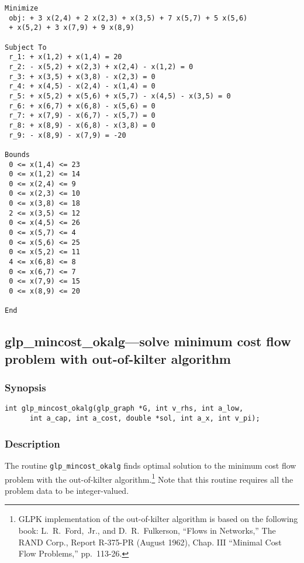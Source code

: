 \begin{footnotesize}
\begin{verbatim}
Minimize
 obj: + 3 x(2,4) + 2 x(2,3) + x(3,5) + 7 x(5,7) + 5 x(5,6)
 + x(5,2) + 3 x(7,9) + 9 x(8,9)

Subject To
 r_1: + x(1,2) + x(1,4) = 20
 r_2: - x(5,2) + x(2,3) + x(2,4) - x(1,2) = 0
 r_3: + x(3,5) + x(3,8) - x(2,3) = 0
 r_4: + x(4,5) - x(2,4) - x(1,4) = 0
 r_5: + x(5,2) + x(5,6) + x(5,7) - x(4,5) - x(3,5) = 0
 r_6: + x(6,7) + x(6,8) - x(5,6) = 0
 r_7: + x(7,9) - x(6,7) - x(5,7) = 0
 r_8: + x(8,9) - x(6,8) - x(3,8) = 0
 r_9: - x(8,9) - x(7,9) = -20

Bounds
 0 <= x(1,4) <= 23
 0 <= x(1,2) <= 14
 0 <= x(2,4) <= 9
 0 <= x(2,3) <= 10
 0 <= x(3,8) <= 18
 2 <= x(3,5) <= 12
 0 <= x(4,5) <= 26
 0 <= x(5,7) <= 4
 0 <= x(5,6) <= 25
 0 <= x(5,2) <= 11
 4 <= x(6,8) <= 8
 0 <= x(6,7) <= 7
 0 <= x(7,9) <= 15
 0 <= x(8,9) <= 20

End
\end{verbatim}
\end{footnotesize}

\subsection{glp\_mincost\_okalg---solve minimum cost flow problem with
out-of-kilter algorithm}

\subsubsection*{Synopsis}

\begin{verbatim}
int glp_mincost_okalg(glp_graph *G, int v_rhs, int a_low,
      int a_cap, int a_cost, double *sol, int a_x, int v_pi);
\end{verbatim}

\subsubsection*{Description}

The routine \verb|glp_mincost_okalg| finds optimal solution to the
minimum cost flow problem with the out-of-kilter
algorithm.\footnote{GLPK implementation of the out-of-kilter algorithm
is based on the following book: L.~R.~Ford,~Jr., and D.~R.~Fulkerson,
``Flows in Networks,'' The RAND Corp., Report R-375-PR (August 1962),
Chap. III ``Minimal Cost Flow Problems,'' pp.~113-26.} Note that this
routine requires all the problem data to be integer-valued.

